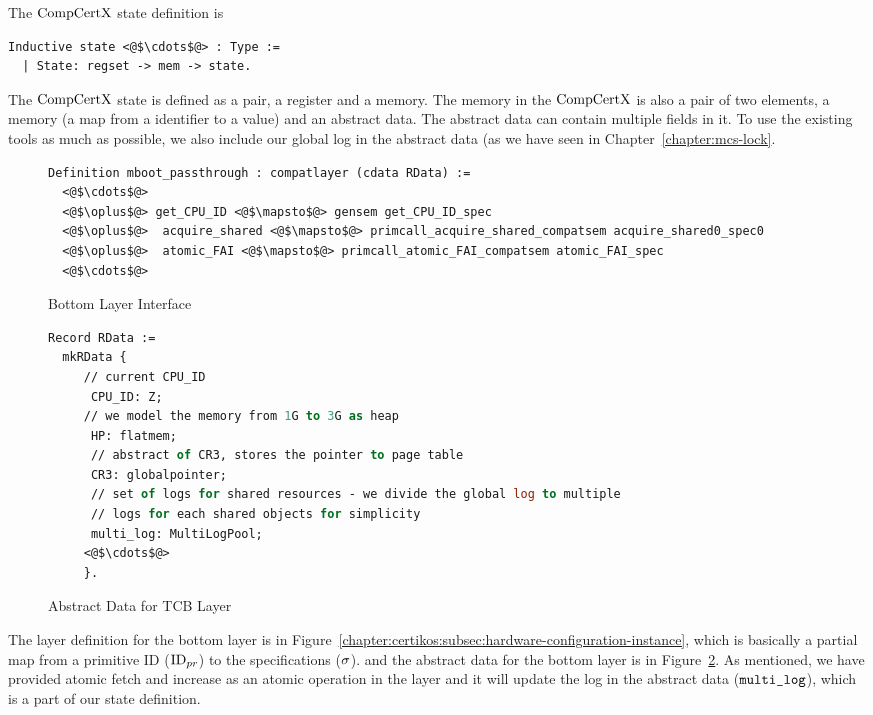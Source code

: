 
The $\mathrm{CompCertX}$ state definition is
\begin{lstlisting}
Inductive state <@$\cdots$@> : Type :=
  | State: regset -> mem -> state.
\end{lstlisting}
The $\mathrm{CompCertX}$ state is defined as a pair, 
a register and a memory. 
The memory in the $\mathrm{CompCertX}$ is also a pair of two elements, 
a memory (a map from a identifier to a value) and an abstract data. 
The abstract data can contain 
multiple fields in it. 
To use the existing tools as much as possible, 
we also include our global log in the abstract data (as we have seen in Chapter~\ref{chapter:mcs-lock}.

\begin{figure}
\begin{lstlisting}[language=Caml]
Definition mboot_passthrough : compatlayer (cdata RData) :=
  <@$\cdots$@>
  <@$\oplus$@> get_CPU_ID <@$\mapsto$@> gensem get_CPU_ID_spec
  <@$\oplus$@>  acquire_shared <@$\mapsto$@> primcall_acquire_shared_compatsem acquire_shared0_spec0
  <@$\oplus$@>  atomic_FAI <@$\mapsto$@> primcall_atomic_FAI_compatsem atomic_FAI_spec
  <@$\cdots$@>
\end{lstlisting}
\caption{Bottom Layer Interface}
\label{fig:chapter:certikos:bottom-layer-interface}
\end{figure}

\begin{figure}
\begin{lstlisting}[language=Caml]
Record RData :=
  mkRData {
     // current CPU_ID
      CPU_ID: Z;
     // we model the memory from 1G to 3G as heap            
      HP: flatmem;     
      // abstract of CR3, stores the pointer to page table
      CR3: globalpointer;
      // set of logs for shared resources - we divide the global log to multiple
      // logs for each shared objects for simplicity   
      multi_log: MultiLogPool;     
     <@$\cdots$@>
     }.
\end{lstlisting}
\caption{Abstract Data for TCB Layer}
\label{fig:chapter:certikos:abstract-data-for-bottom-layer}
\end{figure}

The layer definition for the bottom layer is in Figure~\ref{chapter:certikos:subsec:hardware-configuration-instance},
which is basically a partial map from a primitive ID (${\mathrm{ID}_{pr}}$) to the specifications ($\sigma$).
and the abstract data for the bottom layer is in Figure~\ref{fig:chapter:certikos:abstract-data-for-bottom-layer}.
As mentioned, 
we have provided atomic fetch and increase as an atomic operation in the layer 
and it will update the log in the abstract data (${\mathrm{\texttt{multi\_log}}}$), which is 
a part of our state definition. 

